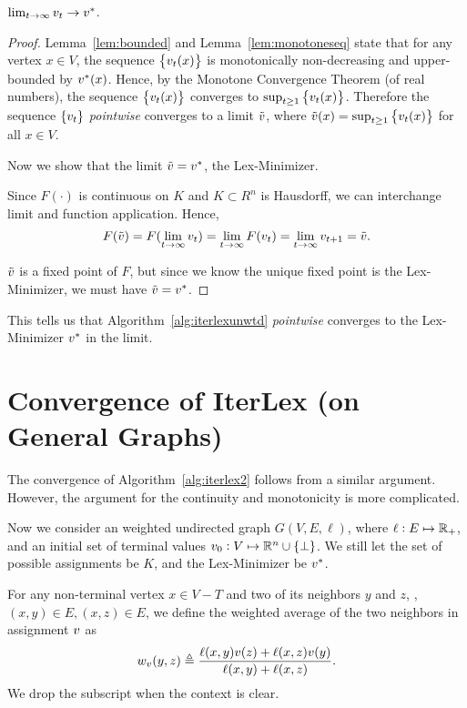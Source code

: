\documentclass[12pt]{amsart}
\begin{document}
\begin{theorem}\label{thm:convergence}
$\lim_{t\to \infty} v_t \to v^*$.
\end{theorem}
\begin{proof}
Lemma~\ref{lem:bounded} and Lemma~\ref{lem:monotoneseq} state that for any vertex $x\in V$, the sequence $\left\{v_t(x)\right\}$ is monotonically non-decreasing and upper-bounded by $v^*(x)$. Hence, by the Monotone Convergence Theorem (of real numbers), the sequence $\left\{v_t(x)\right\}$ converges to $\sup_{t\geq 1}\left\{v_t(x)\right\}$. Therefore the sequence $\left\{v_t\right\}$ \emph{pointwise} converges to a limit $\tilde{v}$, where $\tilde{v}(x) = \sup_{t\geq 1}\left\{v_t(x)\right\}$ for all $x\in V$.

Now we show that the limit $\tilde{v}=v^*$, the Lex-Minimizer.

Since $F(\cdot)$ is continuous on $K$ and $K\subset R^n$ is Hausdorff, we can interchange limit and function application. Hence, 
\[ F(\tilde{v}) = F(\lim_{t\to\infty}v_t) = \lim_{t\to\infty}F(v_t) = \lim_{t\to\infty}v_{t+1} = \tilde{v}. \]

$\tilde{v}$ is a fixed point of $F$, but since we know the unique fixed point is the Lex-Minimizer, we must have $\tilde{v}=v^*$.
\end{proof}
This tells us that Algorithm~\ref{alg:iterlexunwtd} \emph{pointwise} converges to the Lex-Minimizer $v^*$ in the limit.

\section{Convergence of IterLex (on General Graphs)}\label{sec:iterlexconv}
The convergence of Algorithm~\ref{alg:iterlex2} follows from a similar argument. However, the argument for the continuity and monotonicity is more complicated. 

Now we consider an weighted undirected graph $G(V,E,\ell)$, where $\ell:E\mapsto \mathbb R_+$, and an initial set of terminal values $v_0: V\mapsto \mathbb R^n\cup\left\{\perp\right\}$. We still let the set of possible assignments be $K$, and the Lex-Minimizer be $v^*$.
\begin{definition}
For any non-terminal vertex $x\in V-T$ and two of its neighbors $y$ and $z$, \ie, $(x,y)\in E, (x,z)\in E$, we define the weighted average of the two neighbors in assignment $v$ as $$w_{v}(y,z)\triangleq \frac{\ell(x,y)v(z) + \ell(x,z)v(y)}{\ell(x,y)+\ell(x,z)}.$$ We drop the subscript when the context is clear.
\end{definition}
\end{document}

